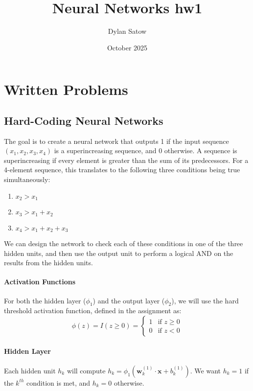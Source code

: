\documentclass{article}
\title{Neural Networks hw1}
\author{Dylan Satow}
\date{October 2025}
\begin{document}
\maketitle

\section{Written Problems}

\subsection{Hard-Coding Neural Networks}

The goal is to create a neural network that outputs 1 if the input sequence $(x_1, x_2, x_3, x_4)$ is a superincreasing sequence, and 0 otherwise. A sequence is superincreasing if every element is greater than the sum of its predecessors. For a 4-element sequence, this translates to the following three conditions being true simultaneously:
\begin{enumerate}
    \item $x_2 > x_1$
    \item $x_3 > x_1 + x_2$
    \item $x_4 > x_1 + x_2 + x_3$
\end{enumerate}

We can design the network to check each of these conditions in one of the three hidden units, and then use the output unit to perform a logical AND on the results from the hidden units.

\paragraph{Activation Functions}
For both the hidden layer ($\phi_1$) and the output layer ($\phi_2$), we will use the hard threshold activation function, defined in the assignment as:
\[ \phi(z) = I(z \ge 0) = \begin{cases} 1 & \text{if } z \ge 0 \\ 0 & \text{if } z < 0 \end{cases} \]

\paragraph{Hidden Layer}
Each hidden unit $h_k$ will compute $h_k = \phi_1(\mathbf{w}^{(1)}_k \cdot \mathbf{x} + b^{(1)}_k)$. We want $h_k=1$ if the $k^{th}$ condition is met, and $h_k=0$ otherwise.
\end{document}
